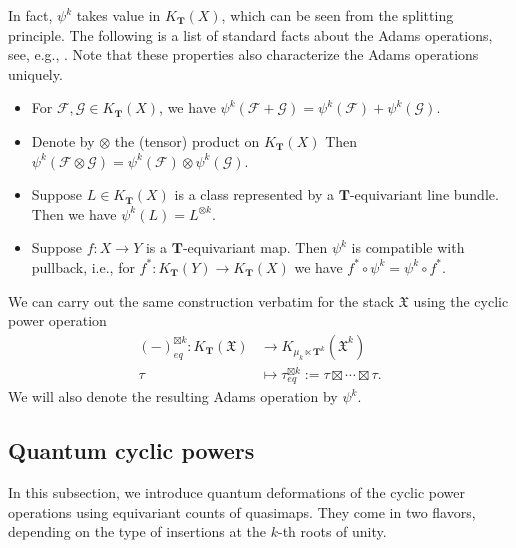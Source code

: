 \documentclass[reqno]{amsart}
\numberwithin{equation}{section}
\numberwithin{equation}{section}
\numberwithin{equation}{section}
\theoremstyle{definition}
\theoremstyle{remark}
\theoremstyle{remark}
\begin{document}
In fact, $\psi^k$ takes value in $K_{\mathbf{T}}(X)$, which can be seen from the splitting principle. The following is a list of standard facts about the Adams operations, see, e.g., \cite[Section 2]{atiyah-power}. Note that these properties also characterize the Adams operations uniquely.
\begin{itemize}
    \item For $\mathcal{F}, \mathcal{G} \in K_{\mathbf{T}}(X)$, we have $\psi^k(\mathcal{F}+ \mathcal{G}) = \psi^k(\mathcal{F}) + \psi^k(\mathcal{G})$.
    \item Denote by $\otimes$ the (tensor) product on $K_{\mathbf{T}}(X)$ Then $\psi^k(\mathcal{F} \otimes \mathcal{G}) = \psi^k(\mathcal{F}) \otimes \psi^k(\mathcal{G})$.
    \item Suppose $L \in K_{\mathbf{T}}(X)$ is a class represented by a $\mathbf{T}$-equivariant line bundle. Then we have $\psi^k(L) = L^{\otimes k}$.
    \item Suppose $f: X \to Y$ is a $\mathbf{T}$-equivariant map. Then $\psi^k$ is compatible with pullback, i.e., for $f^*: K_{\mathbf{T}}(Y) \to K_{\mathbf{T}}(X)$ we have $f^* \circ \psi^k = \psi^k \circ f^*$.
\end{itemize}

We can carry out the same construction verbatim for the stack $\mathfrak{X}$ using the cyclic power operation
\begin{equation}\label{eqn:power-stack}
\begin{aligned}
    (-)^{\boxtimes k}_{eq} : K_\mathbf{T}(\mathfrak{X}) &\to K_{\mu_k \ltimes \mathbf{T}^k}(\mathfrak{X}^k) \\
     \tau & \mapsto \tau^{\boxtimes k}_{eq} := \tau \boxtimes \cdots \boxtimes \tau.
\end{aligned}
\end{equation}
We will also denote the resulting Adams operation by $\psi^k$.


\subsection{Quantum cyclic powers}\label{ssec:oper-definition}
In this subsection, we introduce quantum deformations of the cyclic power operations using equivariant counts of quasimaps. They come in two flavors, depending on the type of insertions at the $k$-th roots of unity.
\end{document}
